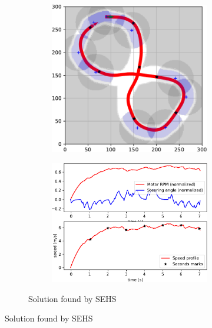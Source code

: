 \begin{figure}[!tbp]
	\vspace{0.75cm}
	
	\begin{subfigure}[t]{\textwidth}
		\begin{subfigure}[t]{0.45\textwidth}
			\includegraphics[width=\textwidth]{../img/experiments/eight-sehs-trajectory}
		\end{subfigure}
		\hfill
		\begin{subfigure}[t]{0.45\textwidth}
			\includegraphics[width=\textwidth]{../img/experiments/eight-sehs-actuators}
		\end{subfigure}
		\caption{Solution found by SEHS}
		\label{fig:eight-sehs}
	\end{subfigure}


\end{figure}

